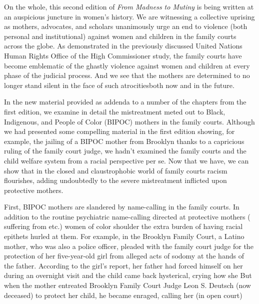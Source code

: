 On the whole, this second edition of \textit{From Madness to Mutiny} is being
written at an auspicious juncture in women’s history. We are witnessing
a collective uprising as mothers, advocates, and scholars unanimously
urge an end to violence (both personal and institutional) against women
and children in the family courts across the globe. As demonstrated in
the previously discussed United Nations Human Rights Office of the
High Commissioner study, the family courts have become emblematic
of the ghastly violence against women and children at every phase of
the judicial process. And we see that the mothers are determined to no
longer stand silent in the face of such atrocities\mdash{}both now and in the
future. \pfl{}


\enlargethispage{1em}



\noindent{}In the new material provided as addenda to a number of the chapters
from the first edition, we examine in detail the mistreatment meted
out to Black, Indigenous, and People of Color (BIPOC) mothers in the
family courts. Although we had presented some compelling material in
the first edition showing, for example, the jailing of a BIPOC mother
from Brooklyn thanks to a capricious ruling of the family court judge,
we hadn’t examined the family courts and the child welfare system
from a racial perspective per se. Now that we have, we can show that
in the closed and claustrophobic world of family courts racism 
flourishes, adding undoubtedly to the severe mistreatment inflicted upon
protective mothers. \pfl{}\newpage{}


\vspace{3em}


\noindent{}First, BIPOC mothers are slandered by name-calling in the family
courts. In addition to the routine psychiatric name-calling directed
at protective mothers ( suffering from    etc.) women of color shoulder the extra
burden of having racial epithets hurled at them. For example, in the
Brooklyn Family Court, a Latino mother, who was also a police officer, pleaded with the family court judge for the protection of her
five-year-old girl from alleged acts of sodomy at the hands of the father. 
According to the girl's report, her father had forced himself on her
during an overnight visit and the child came back hysterical, crying how she   But when the mother entreated Brooklyn Family Court Judge
Leon S. Deutsch (now deceased) to protect her child, he became enraged, 
calling her (in open court)  \pfl{}

